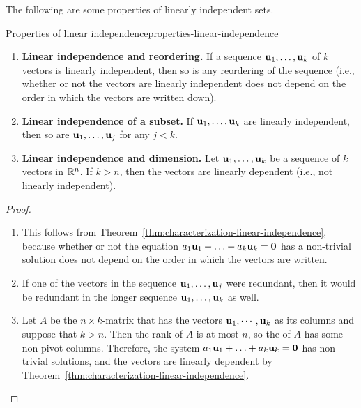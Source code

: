 The following are some properties of linearly independent sets.

\begin{theorem}{Properties of linear independence}{properties-linear-independence}
  \begin{enumerate}
  \item \textbf{Linear independence and reordering.} If a sequence
    $\mbox{\bf u}_1,\ldots,\mbox{\bf u}_k$ of $k$ vectors is linearly
    independent, then so is any reordering of the sequence (i.e.,
    whether or not the vectors are linearly independent does not
    depend on the order in which the vectors are written down).
  \item \textbf{Linear independence of a subset.} If
    $\mbox{\bf u}_1,\ldots,\mbox{\bf u}_k$ are linearly independent, then so
    are $\mbox{\bf u}_1,\ldots,\mbox{\bf u}_j$ for any $j<k$.
  \item \textbf{Linear independence and dimension.} Let
    $\mbox{\bf u}_1,\ldots,\mbox{\bf u}_k$ be a sequence of $k$ vectors in
    $\mathbb{R}^n$. If $k>n$, then the vectors are linearly dependent (i.e.,
    not linearly independent).
  \end{enumerate}
\end{theorem}

\begin{proof}
  \begin{enumerate}
  \item This follows from
    Theorem~\ref{thm:characterization-linear-independence}, because
    whether or not the equation
    $a_1\mbox{\bf u}_1 + \ldots + a_k\mbox{\bf u}_k = \mbox{\bf 0}$ has a
    non-trivial solution does not depend on the order in which the
    vectors are written.
  \item If one of the vectors in the sequence
    $\mbox{\bf u}_1,\ldots,\mbox{\bf u}_j$ were redundant, then it would be
    redundant in the longer sequence $\mbox{\bf u}_1,\ldots,\mbox{\bf u}_k$ as
    well.
  \item Let $A$ be the $n\times k$-matrix that has the vectors
    $\mbox{\bf u}_{1},\cdots,\mbox{\bf u}_{k}$ as its columns and suppose that
    $k>n$. Then the rank of $A$ is at most $n$, so the {\ef} of $A$
    has some non-pivot columns. Therefore, the system
    $a_1\mbox{\bf u}_1 + \ldots + a_k\mbox{\bf u}_k = \mbox{\bf 0}$ has
    non-trivial solutions, and the vectors are linearly dependent by
    Theorem~\ref{thm:characterization-linear-independence}.
  \end{enumerate}
\end{proof}

